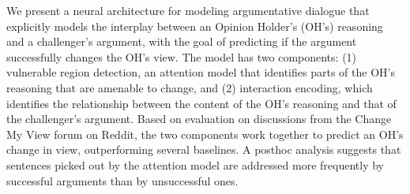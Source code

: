 We present a neural architecture for modeling argumentative dialogue that explicitly models the interplay between an Opinion Holder's (OH's) reasoning and a challenger's argument, with the goal of predicting if the argument successfully changes the OH's view. The model has two components: (1) vulnerable region detection, an attention model that identifies parts of the OH's reasoning that are amenable to change, and (2) interaction encoding, which identifies the relationship between the content of the OH's reasoning and that of the challenger's argument. Based on evaluation on discussions from the Change My View forum on Reddit, the two components work together to predict an OH's change in view, outperforming several baselines. A posthoc analysis suggests that sentences picked out by the attention model are addressed more frequently by successful arguments than by unsuccessful ones.
